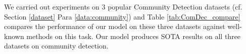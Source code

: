 % 


We carried out experiments on 3 popular Community Detection datasets (cf. Section \ref{dataset} Para \ref{data:community}) and Table \ref{tab:ComDec_compare} compares the performance of our model on these three datasets
against well-known methods on this task. Our model produces SOTA results on all three datasets on community detection.




